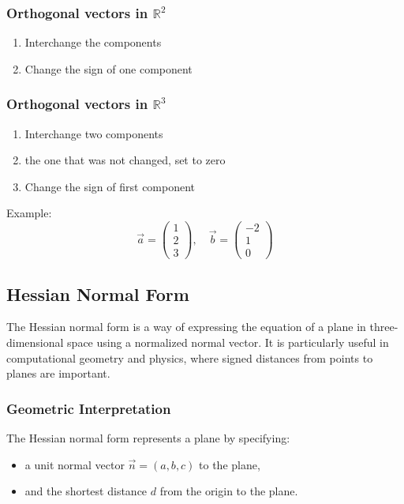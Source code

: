 \subsubsection{Orthogonal vectors in \texorpdfstring{\(\mathbb{R}^2\)}{}}

\begin{enumerate}
	\item Interchange the components
	\item Change the sign of one component
\end{enumerate}

\subsubsection{Orthogonal vectors in \texorpdfstring{\(\mathbb{R}^3\)}{}}
\begin{enumerate}
	\item Interchange two components
	\item the one that was not changed, set to zero
	\item Change the sign of first component
\end{enumerate}
 Example:
\[
	\vec{a} = \begin{pmatrix} 1 \\ 2 \\ 3 \end{pmatrix}, \quad \vec{b} = \begin{pmatrix} -2 \\ 1 \\ 0 \end{pmatrix}
\]

\subsection{Hessian Normal Form}

The Hessian normal form is a way of expressing the equation of a plane in three-dimensional space using a normalized normal vector. It is particularly useful in computational geometry and physics, where signed distances from points to planes are important.

\subsubsection{Geometric Interpretation}

The Hessian normal form represents a plane by specifying:
\begin{itemize}[label=\(-\)]
	\item a unit normal vector \(\vec{n} = (a, b, c)\) to the plane,
	\item and the shortest distance \(d\) from the origin to the plane.
\end{itemize}

